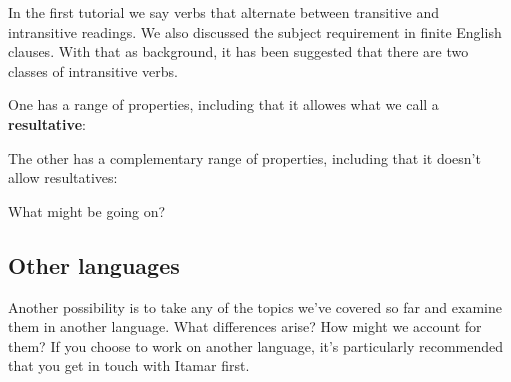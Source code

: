 \documentclass{article}
\begin{document}
In the first tutorial we say verbs that alternate between transitive and intransitive readings. We also discussed the subject requirement in finite English clauses. With that as background, it has been suggested that there are two classes of intransitive verbs.

One has a range of properties, including that it allowes what we call a \textbf{resultative}:
\ea 
    \z
\ex
    \z
\z

The other has a complementary range of properties, including that it doesn't allow resultatives:

\ea
    \z
\ex
    \z
\z

What might be going on?

\subsection{Other languages}

Another possibility is to take any of the topics we've covered so far and examine them in another language. What differences arise? How might we account for them? If you choose to work on another language, it's particularly recommended that you get in touch with Itamar first.


\printbibliography
\end{document}
